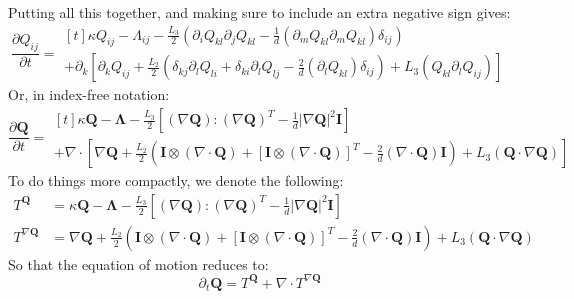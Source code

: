 \documentclass[reqno]{article}
\newcommand{\Q}{\mathbf{Q}}
\newcommand{\bLambda}{\boldsymbol{\Lambda}}
\begin{document}
Putting all this together, and making sure to include an extra negative sign gives:
\begin{equation}
    \frac{\partial Q_{ij}}{\partial t}
    =
    \begin{multlined}[t]
        \kappa Q_{ij}
        - \Lambda_{ij}
        - \frac{L_3}{2} \left( \partial_i Q_{kl} \partial_j Q_{kl} 
            - \tfrac{1}{d} \left(\partial_m Q_{kl} \partial_m Q_{kl} \right) \delta_{ij}
        \right) \\
        + \partial_k \left[
            \partial_k Q_{ij}
            + \frac{L_2}{2} \left( 
                \delta_{kj} \partial_l Q_{li} 
                + \delta_{ki} \partial_l Q_{lj} 
                - \tfrac{2}{d} \left( \partial_l Q_{kl} \right) \delta_{ij} \right)
            + L_3 \left( Q_{kl} \partial_l Q_{ij} \right)
        \right]
    \end{multlined}
\end{equation}
Or, in index-free notation:
\begin{equation}
    \frac{\partial \Q}{\partial t}
    =
    \begin{multlined}[t]
        \kappa \Q 
        - \bLambda 
        - \frac{L_3}{2} \left[ 
            \left( \nabla \Q \right) : \left( \nabla \Q \right)^T
            - \tfrac{1}{d} \left| \nabla \Q \right|^2 \mathbf I
        \right] \\
        + \nabla \cdot \left[
            \nabla \Q
            + \frac{L_2}{2} \left(
                \mathbf I \otimes \left( \nabla \cdot \Q \right) 
                + \left[ \mathbf I \otimes \left( \nabla \cdot \Q \right) \right]^T
                - \tfrac{2}{d} \left( \nabla \cdot \Q \right) \mathbf I
            \right)
            + L_3 \left( \Q \cdot \nabla \Q \right) 
        \right]
\end{multlined}
\end{equation}
To do things more compactly, we denote the following:
\begin{align}
    T^\Q
    &=
    \kappa \Q 
    - \bLambda 
    - \frac{L_3}{2} \left[ 
        \left( \nabla \Q \right) : \left( \nabla \Q \right)^T
        - \tfrac{1}{d} \left| \nabla \Q \right|^2 \mathbf I
    \right] \\
    T^{\nabla \Q}
    &=
    \nabla \Q
    + \frac{L_2}{2} \left(
        \mathbf I \otimes \left( \nabla \cdot \Q \right) 
        + \left[ \mathbf I \otimes \left( \nabla \cdot \Q \right) \right]^T
        - \tfrac{2}{d} \left( \nabla \cdot \Q \right) \mathbf I
    \right)
    + L_3 \left( \Q \cdot \nabla \Q \right) 
\end{align}
So that the equation of motion reduces to:
\begin{equation}
    \partial_t \Q
    =
    T^\Q
    + \nabla \cdot T^{\nabla \Q}
\end{equation}
\end{document}

